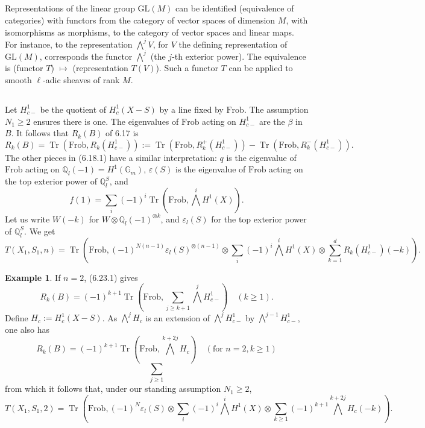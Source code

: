 \documentclass[11pt,a4paper]{article}
\theoremstyle{plain}
\theoremstyle{definition}
\newtheorem{example}[theorem]{Example}
\DeclareMathOperator{\Tr}{Tr}
\newcommand{\Q}{\mathbb{Q}}
\newcommand{\Gm}{\mathbb{G}_m}
\newcommand{\GL}{\mathrm{GL}}
\newcommand{\Frob}{\mathrm{Frob}}
\begin{document}
\subsection{}
Representations of the linear group $\GL(M)$ can be identified (equivalence of categories) with functors from the category of vector spaces of dimension $M$, with isomorphisms as morphisms, to the category of vector spaces and linear maps. For instance, to the representation $\bigwedge^j V$, for $V$ the defining representation of $\GL(M)$, corresponds the functor $\bigwedge^j$ (the $j$-th exterior power). The equivalence is (functor $T$) $\mapsto$ (representation $T(V)$). Such a functor $T$ can be applied to smooth $\ell$-adic sheaves of rank $M$.

\subsection{}
Let $H_{c-}^1$ be the quotient of $H_c^1(X - S)$ by a line fixed by $\Frob$. The assumption $N_1 \geq 2$ ensures there is one. The eigenvalues of $\Frob$ acting on $H_{c-}^1$ are the $\beta$ in $B$. It follows that $R_k(B)$ of 6.17 is
\begin{equation}
R_k(B) = \Tr(\Frob, R_k(H_{c-}^1)) := \Tr(\Frob, R_k^+(H_{c-}^1)) - \Tr(\Frob, R_k^-(H_{c-}^1)). \tag{6.25.1}
\end{equation}
The other pieces in (6.18.1) have a similar interpretation: $q$ is the eigenvalue of $\Frob$ acting on $\Q_l(-1) = H^1(\Gm)$, $\varepsilon(S)$ is the eigenvalue of $\Frob$ acting on the top exterior power of $\Q_l^S$, and
\[
f(1) = \sum_i (-1)^i \Tr(\Frob, \bigwedge^i H^1(X)).
\]
Let us write $W(-k)$ for $W \otimes \Q_l(-1)^{\otimes k}$, and $\varepsilon_l(S)$ for the top exterior power of $\Q_l^S$. We get
\begin{equation}
T(X_1, S_1, n) = \Tr\left(\Frob, (-1)^{N(n-1)} \varepsilon_l(S)^{\otimes (n-1)} \otimes \sum_i (-1)^i \bigwedge^i H^1(X) \otimes \sum_{k=1}^d R_k(H_{c-}^1)(-k)\right). \tag{6.25.2}
\end{equation}

\begin{example}
If $n = 2$, (6.23.1) gives
\[
R_k(B) = (-1)^{k+1} \Tr\left(\Frob, \sum_{j \geq k+1} \bigwedge^j H_{c-}^1\right) \quad (k \geq 1).
\]
Define $H_c := H_c^1(X - S)$. As $\bigwedge^j H_c$ is an extension of $\bigwedge^j H_{c-}^1$ by $\bigwedge^{j-1} H_{c-}^1$, one also has
\begin{equation}
R_k(B) = (-1)^{k+1} \Tr\left(\Frob, \bigwedge^{k+2j} H_c\right) \quad (\text{for } n = 2, k \geq 1) \tag{6.26.1}
\end{equation}
\[
\sum_{j \geq 1}
\]
from which it follows that, under our standing assumption $N_1 \geq 2$,
\begin{equation}
T(X_1, S_1, 2) = \Tr\left(\Frob, (-1)^N \varepsilon_l(S) \otimes \sum_i (-1)^i \bigwedge^i H^1(X) \otimes \sum_{k \geq 1} (-1)^{k+1} \bigwedge^{k+2j} H_c(-k)\right). \tag{6.26.2}
\end{equation}
\end{example}
\end{document}
